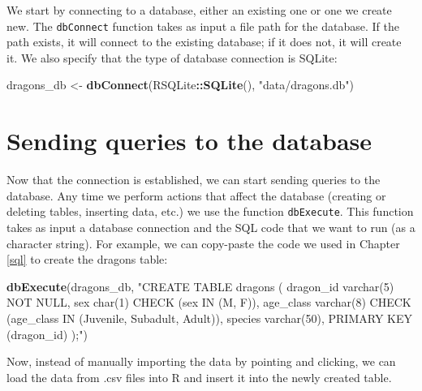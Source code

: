 \documentclass[
]{book}
\newenvironment{Shaded}{\begin{snugshade}}{\end{snugshade}}
\newcommand{\FunctionTok}[1]{\textcolor[rgb]{0.13,0.29,0.53}{\textbf{#1}}}
\newcommand{\NormalTok}[1]{#1}
\newcommand{\OtherTok}[1]{\textcolor[rgb]{0.56,0.35,0.01}{#1}}
\newcommand{\SpecialCharTok}[1]{\textcolor[rgb]{0.81,0.36,0.00}{\textbf{#1}}}
\newcommand{\StringTok}[1]{\textcolor[rgb]{0.31,0.60,0.02}{#1}}
\begin{document}
We start by connecting to a database, either an existing one or one we create
new. The \texttt{dbConnect} function takes as input a file path for the database. If
the path exists, it will connect to the existing database; if it does not, it
will create it. We also specify that the type of database connection is SQLite:

\begin{Shaded}
\begin{Highlighting}[]
\NormalTok{dragons\_db }\OtherTok{\textless{}{-}} \FunctionTok{dbConnect}\NormalTok{(RSQLite}\SpecialCharTok{::}\FunctionTok{SQLite}\NormalTok{(), }\StringTok{"data/dragons.db"}\NormalTok{)}
\end{Highlighting}
\end{Shaded}

\hypertarget{sending-queries-to-the-database}{%
\section{Sending queries to the database}\label{sending-queries-to-the-database}}

Now that the connection is established, we can start sending queries to the
database. Any time we perform actions that affect the database (creating or
deleting tables, inserting data, etc.) we use the function \texttt{dbExecute}. This
function takes as input a database connection and the SQL code that we want to
run (as a character string). For example, we can copy-paste the code we used in
Chapter \ref{sql} to create the dragons table:

\begin{Shaded}
\begin{Highlighting}[]
\FunctionTok{dbExecute}\NormalTok{(dragons\_db, }\StringTok{"CREATE TABLE dragons (}
\StringTok{dragon\_id varchar(5) NOT NULL,}
\StringTok{sex char(1) CHECK (sex IN (\textquotesingle{}M\textquotesingle{}, \textquotesingle{}F\textquotesingle{})),}
\StringTok{age\_class varchar(8) CHECK (age\_class IN (\textquotesingle{}Juvenile\textquotesingle{}, \textquotesingle{}Subadult\textquotesingle{}, \textquotesingle{}Adult\textquotesingle{})),}
\StringTok{species varchar(50),}
\StringTok{PRIMARY KEY (dragon\_id)}
\StringTok{);"}\NormalTok{)}
\end{Highlighting}
\end{Shaded}

Now, instead of manually importing the data by pointing and clicking, we can
load the data from .csv files into R and insert it into the newly created table.
\end{document}
